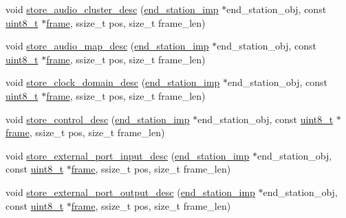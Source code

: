 \begin{DoxyCompactItemize}
\item 
void \hyperlink{classavdecc__lib_1_1configuration__descriptor__imp_aa2566ff1723e552c9a79075d9fe5bb62}{store\+\_\+audio\+\_\+cluster\+\_\+desc} (\hyperlink{classavdecc__lib_1_1end__station__imp}{end\+\_\+station\+\_\+imp} $\ast$end\+\_\+station\+\_\+obj, const \hyperlink{stdint_8h_aba7bc1797add20fe3efdf37ced1182c5}{uint8\+\_\+t} $\ast$\hyperlink{gst__avb__playbin_8c_ac8e710e0b5e994c0545d75d69868c6f0}{frame}, ssize\+\_\+t pos, size\+\_\+t frame\+\_\+len)
\item 
void \hyperlink{classavdecc__lib_1_1configuration__descriptor__imp_ad2e9e21a55cd9b1b5d1889d6e727f1c2}{store\+\_\+audio\+\_\+map\+\_\+desc} (\hyperlink{classavdecc__lib_1_1end__station__imp}{end\+\_\+station\+\_\+imp} $\ast$end\+\_\+station\+\_\+obj, const \hyperlink{stdint_8h_aba7bc1797add20fe3efdf37ced1182c5}{uint8\+\_\+t} $\ast$\hyperlink{gst__avb__playbin_8c_ac8e710e0b5e994c0545d75d69868c6f0}{frame}, ssize\+\_\+t pos, size\+\_\+t frame\+\_\+len)
\item 
void \hyperlink{classavdecc__lib_1_1configuration__descriptor__imp_abee3ee15c0c719ebf3e32ee7388f547d}{store\+\_\+clock\+\_\+domain\+\_\+desc} (\hyperlink{classavdecc__lib_1_1end__station__imp}{end\+\_\+station\+\_\+imp} $\ast$end\+\_\+station\+\_\+obj, const \hyperlink{stdint_8h_aba7bc1797add20fe3efdf37ced1182c5}{uint8\+\_\+t} $\ast$\hyperlink{gst__avb__playbin_8c_ac8e710e0b5e994c0545d75d69868c6f0}{frame}, ssize\+\_\+t pos, size\+\_\+t frame\+\_\+len)
\item 
void \hyperlink{classavdecc__lib_1_1configuration__descriptor__imp_ac115c63b08098c457ad25c5e9f2c1a23}{store\+\_\+control\+\_\+desc} (\hyperlink{classavdecc__lib_1_1end__station__imp}{end\+\_\+station\+\_\+imp} $\ast$end\+\_\+station\+\_\+obj, const \hyperlink{stdint_8h_aba7bc1797add20fe3efdf37ced1182c5}{uint8\+\_\+t} $\ast$\hyperlink{gst__avb__playbin_8c_ac8e710e0b5e994c0545d75d69868c6f0}{frame}, ssize\+\_\+t pos, size\+\_\+t frame\+\_\+len)
\item 
void \hyperlink{classavdecc__lib_1_1configuration__descriptor__imp_a01115ef5bee84910322002c40a822a34}{store\+\_\+external\+\_\+port\+\_\+input\+\_\+desc} (\hyperlink{classavdecc__lib_1_1end__station__imp}{end\+\_\+station\+\_\+imp} $\ast$end\+\_\+station\+\_\+obj, const \hyperlink{stdint_8h_aba7bc1797add20fe3efdf37ced1182c5}{uint8\+\_\+t} $\ast$\hyperlink{gst__avb__playbin_8c_ac8e710e0b5e994c0545d75d69868c6f0}{frame}, ssize\+\_\+t pos, size\+\_\+t frame\+\_\+len)
\item 
void \hyperlink{classavdecc__lib_1_1configuration__descriptor__imp_a46bdcb3e0bbe17f2614a284001c88260}{store\+\_\+external\+\_\+port\+\_\+output\+\_\+desc} (\hyperlink{classavdecc__lib_1_1end__station__imp}{end\+\_\+station\+\_\+imp} $\ast$end\+\_\+station\+\_\+obj, const \hyperlink{stdint_8h_aba7bc1797add20fe3efdf37ced1182c5}{uint8\+\_\+t} $\ast$\hyperlink{gst__avb__playbin_8c_ac8e710e0b5e994c0545d75d69868c6f0}{frame}, ssize\+\_\+t pos, size\+\_\+t frame\+\_\+len)

\end{DoxyCompactItemize}
